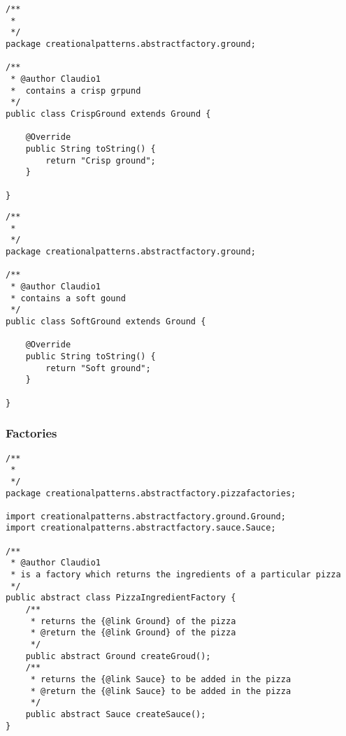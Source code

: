 \documentclass{article}
\begin{document}
\begin{lstlisting}
/**
 * 
 */
package creationalpatterns.abstractfactory.ground;

/**
 * @author Claudio1
 *	contains a crisp grpund
 */
public class CrispGround extends Ground {

	@Override
	public String toString() {
		return "Crisp ground";
	}

}
\end{lstlisting}

\begin{lstlisting}
/**
 * 
 */
package creationalpatterns.abstractfactory.ground;

/**
 * @author Claudio1
 * contains a soft gound
 */
public class SoftGround extends Ground {

	@Override
	public String toString() {
		return "Soft ground";
	}

}
\end{lstlisting}

\subsubsection{Factories}
\begin{lstlisting}
/**
 * 
 */
package creationalpatterns.abstractfactory.pizzafactories;

import creationalpatterns.abstractfactory.ground.Ground;
import creationalpatterns.abstractfactory.sauce.Sauce;

/**
 * @author Claudio1
 * is a factory which returns the ingredients of a particular pizza
 */
public abstract class PizzaIngredientFactory {
	/**
	 * returns the {@link Ground} of the pizza
	 * @return the {@link Ground} of the pizza
	 */
	public abstract Ground createGroud();
	/**
	 * returns the {@link Sauce} to be added in the pizza
	 * @return the {@link Sauce} to be added in the pizza
	 */
	public abstract Sauce createSauce();
}
\end{lstlisting}
\end{document}
